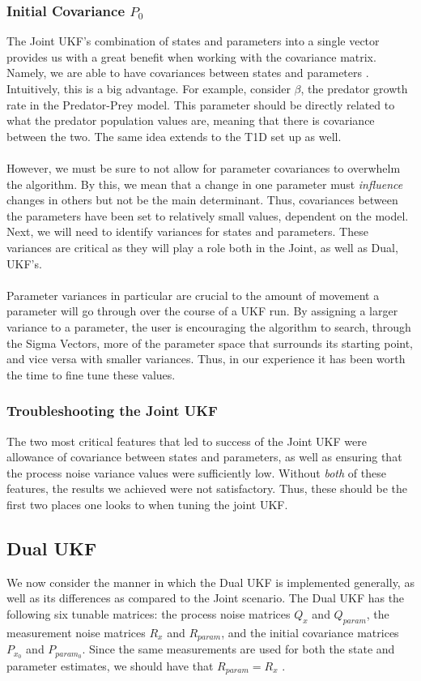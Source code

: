 \documentclass{article}
\begin{document}
\subsubsection{Initial Covariance $P_0$}
The Joint UKF's combination of states and parameters into a single vector provides us with a great benefit when working with the covariance matrix. Namely, we are able to have covariances between states and parameters \cite{GoveHollingerDual}. Intuitively, this is a big advantage. For example, consider $\beta$, the predator growth rate in the Predator-Prey model. This parameter should be directly related to what the predator population values are, meaning that there is covariance between the two. The same idea extends to the T1D set up as well.\\
\\
However, we must be sure to not allow for parameter covariances to overwhelm the algorithm. By this, we mean that a change in one parameter must \emph{influence} changes in others but not be the main determinant. Thus, covariances between the parameters have been set to relatively small values, dependent on the model. Next, we will need to identify variances for states and parameters. These variances are critical as they will play a role both in the Joint, as well as Dual, UKF's.\\
\\
Parameter variances in particular are crucial to the amount of movement a parameter will go through over the course of a UKF run. By assigning a larger variance to a parameter, the user is encouraging the algorithm to search, through the Sigma Vectors, more of the parameter space that surrounds its starting point, and vice versa with smaller variances. Thus, in our experience it has been worth the time to fine tune these values.


\subsubsection{Troubleshooting the Joint UKF}
The two most critical features that led to success of the Joint UKF were allowance of covariance between states and parameters, as well as ensuring that the process noise variance values were sufficiently low. Without \emph{both} of these features, the results we achieved were not satisfactory. Thus, these should be the first two places one looks to when tuning the joint UKF.


\subsection{Dual UKF}
We now consider the manner in which the Dual UKF is implemented generally, as well as its differences as compared to the Joint scenario. The Dual UKF has the following six tunable matrices: the process noise matrices $Q_x$ and $Q_{param}$, the measurement noise matrices $R_x$ and $R_{param}$, and the initial covariance matrices $P_{x_0}$ and $P_{param_0}$. Since the same measurements are used for both the state and parameter estimates, we should have that $R_{param} = R_x$ \cite{GoveHollingerDual}.\\
\end{document}
